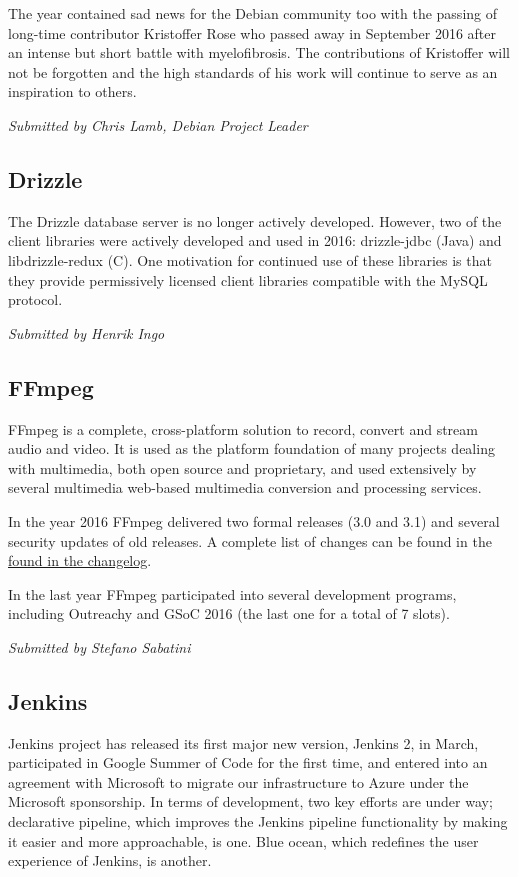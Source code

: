 \documentclass[letterpaper]{report}
\begin{document}
The year contained sad news for the Debian community too with the
passing of long-time contributor Kristoffer Rose who passed away in
September 2016 after an intense but short battle with myelofibrosis. The
contributions of Kristoffer will not be forgotten and the high standards
of his work will continue to serve as an inspiration to others.

{\em Submitted by Chris Lamb, Debian Project Leader}

\subsection{Drizzle}

The Drizzle database server is no longer actively developed. However,
two of the client libraries were actively developed and used in 2016:
drizzle-jdbc (Java) and libdrizzle-redux (C). One motivation for
continued use of these libraries is that they provide permissively
licensed client libraries compatible with the MySQL protocol.

{\em Submitted by Henrik Ingo}

\subsection{FFmpeg}

FFmpeg is a complete, cross-platform solution to record, convert and
stream audio and video. It is used as the platform foundation of many
projects dealing with multimedia, both open source and proprietary, and
used extensively by several multimedia web-based multimedia conversion
and processing services.

In the year 2016 FFmpeg delivered two formal releases (3.0 and 3.1) and
several security updates of old releases. A complete list of changes can
be found in the
\href{http://git.videolan.org/?p=ffmpeg.git;a=blob_plain;f=Changelog;hb=HEAD}{found
in the changelog}.

In the last year FFmpeg participated into several development programs,
including Outreachy and GSoC 2016 (the last one for a total of 7 slots).

{\em Submitted by Stefano Sabatini}

\subsection{Jenkins}

Jenkins project has released its first major new version, Jenkins 2, in
March, participated in Google Summer of Code for the first time, and
entered into an agreement with Microsoft to migrate our infrastructure
to Azure under the Microsoft sponsorship. In terms of development, two
key efforts are under way; declarative pipeline, which improves the
Jenkins pipeline functionality by making it easier and more
approachable, is one.  Blue ocean, which redefines the user experience
of Jenkins, is another.
\end{document}
